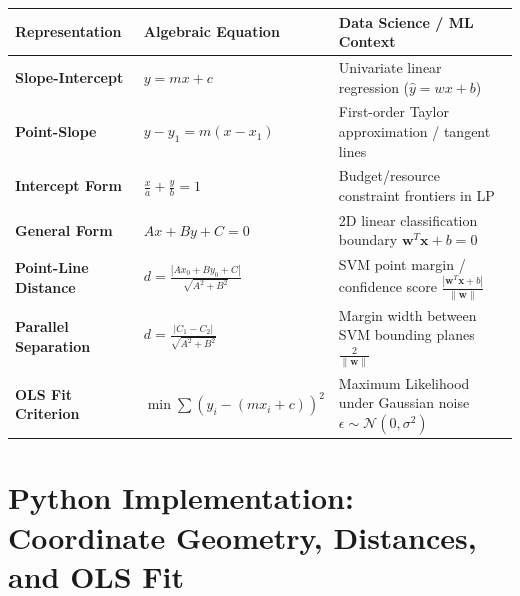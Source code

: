 \begin{center}
\renewcommand{\arraystretch}{1.3}
\begin{tabular}{p{3.2cm}p{4.2cm}p{4.0cm}}
\toprule
\textbf{Representation} & \textbf{Algebraic Equation} & \textbf{Data Science / ML Context} \\
\midrule
\textbf{Slope-Intercept} & $y = mx + c$ & Univariate linear regression ($\hat{y} = w x + b$) \\
\textbf{Point-Slope} & $y - y_1 = m(x - x_1)$ & First-order Taylor approximation / tangent lines \\
\textbf{Intercept Form} & $\frac{x}{a} + \frac{y}{b} = 1$ & Budget/resource constraint frontiers in LP \\
\textbf{General Form} & $Ax + By + C = 0$ & 2D linear classification boundary $\mathbf{w}^T \mathbf{x} + b = 0$ \\
\textbf{Point-Line Distance} & $d = \frac{|Ax_0 + By_0 + C|}{\sqrt{A^2 + B^2}}$ & SVM point margin / confidence score $\frac{|\mathbf{w}^T \mathbf{x} + b|}{\|\mathbf{w}\|}$ \\
\textbf{Parallel Separation} & $d = \frac{|C_1 - C_2|}{\sqrt{A^2 + B^2}}$ & Margin width between SVM bounding planes $\frac{2}{\|\mathbf{w}\|}$ \\
\textbf{OLS Fit Criterion} & $\min \sum (y_i - (mx_i + c))^2$ & Maximum Likelihood under Gaussian noise $\epsilon \sim \mathcal{N}(0, \sigma^2)$ \\
\bottomrule
\end{tabular}
\end{center}

\section{Python Implementation: Coordinate Geometry, Distances, and OLS Fit}

